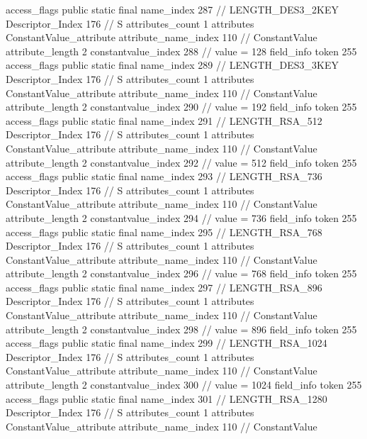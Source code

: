 {{{{{				access_flags	public static final
				name_index	287		// LENGTH_DES3_2KEY
				Descriptor_Index	176		// S
				attributes_count	1
				attributes {
				ConstantValue_attribute {
					attribute_name_index	110		// ConstantValue
					attribute_length	2
					constantvalue_index	288		// value = 128
				}
				}
			}
			field_info {
				token	255
				access_flags	public static final
				name_index	289		// LENGTH_DES3_3KEY
				Descriptor_Index	176		// S
				attributes_count	1
				attributes {
				ConstantValue_attribute {
					attribute_name_index	110		// ConstantValue
					attribute_length	2
					constantvalue_index	290		// value = 192
				}
				}
			}
			field_info {
				token	255
				access_flags	public static final
				name_index	291		// LENGTH_RSA_512
				Descriptor_Index	176		// S
				attributes_count	1
				attributes {
				ConstantValue_attribute {
					attribute_name_index	110		// ConstantValue
					attribute_length	2
					constantvalue_index	292		// value = 512
				}
				}
			}
			field_info {
				token	255
				access_flags	public static final
				name_index	293		// LENGTH_RSA_736
				Descriptor_Index	176		// S
				attributes_count	1
				attributes {
				ConstantValue_attribute {
					attribute_name_index	110		// ConstantValue
					attribute_length	2
					constantvalue_index	294		// value = 736
				}
				}
			}
			field_info {
				token	255
				access_flags	public static final
				name_index	295		// LENGTH_RSA_768
				Descriptor_Index	176		// S
				attributes_count	1
				attributes {
				ConstantValue_attribute {
					attribute_name_index	110		// ConstantValue
					attribute_length	2
					constantvalue_index	296		// value = 768
				}
				}
			}
			field_info {
				token	255
				access_flags	public static final
				name_index	297		// LENGTH_RSA_896
				Descriptor_Index	176		// S
				attributes_count	1
				attributes {
				ConstantValue_attribute {
					attribute_name_index	110		// ConstantValue
					attribute_length	2
					constantvalue_index	298		// value = 896
				}
				}
			}
			field_info {
				token	255
				access_flags	public static final
				name_index	299		// LENGTH_RSA_1024
				Descriptor_Index	176		// S
				attributes_count	1
				attributes {
				ConstantValue_attribute {
					attribute_name_index	110		// ConstantValue
					attribute_length	2
					constantvalue_index	300		// value = 1024
				}
				}
			}
			field_info {
				token	255
				access_flags	public static final
				name_index	301		// LENGTH_RSA_1280
				Descriptor_Index	176		// S
				attributes_count	1
				attributes {
				ConstantValue_attribute {
					attribute_name_index	110		// ConstantValue
}}}}}}}
